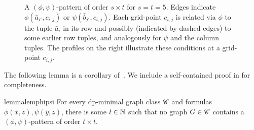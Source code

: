 \begin{figure}[htbp]
    \caption{A $(\phi,\psi)$-pattern of order $s\times t$ for $s=t=5$.
        Edges indicate $\phi(\bar a_{i'},c_{i,j})$ or $\psi(\bar b_{j'},c_{i,j})$.
        Each grid-point $c_{i,j}$ is related via $\phi$ to the tuple $\bar a_i$ in its row and possibly (indicated by dashed edges) to some earlier row tuples, and analogously for $\psi$ and the column tuples.
        The profiles on the right illustrate these conditions at a grid-point $c_{i,j}$.}
    \label{fig:phi-psi-pattern}
\end{figure}



\medskip
The following lemma is a corollary of~\cite[Lemma~C.1]{ordered-tww}. We include a self-contained proof in  for completeness.

\begin{restatable}{lemma}{lemphipsi}\label{lem:phi-psi-patterns}
    For every dp-minimal graph class $\mathscr C$ and formulas $\phi(\bar x,z),\psi(\bar y,z)$, there is some $t\in\mathbb N$ such that no graph $G\in \mathscr C$ contains a $(\phi,\psi)$-pattern of order $t \times t$.
\end{restatable}



